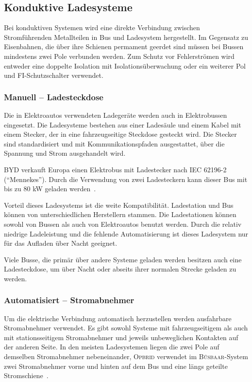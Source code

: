 \subsection{Konduktive Ladesysteme} 
Bei konduktiven Systemen wird eine direkte Verbindung zwischen Stromführenden Metallteilen in Bus und Ladesystem hergestellt. Im Gegensatz zu Eisenbahnen, die über ihre Schienen permament geerdet sind müssen bei Bussen mindestens zwei Pole verbunden werden. Zum Schutz vor Fehlerströmen wird entweder eine doppelte Isolation mit Isolationsüberwachung oder ein weiterer Pol und FI-Schutzschalter verwendet.

\subsubsection{Manuell – Ladesteckdose}
Die in Elektroautos verwendeten Ladegeräte werden auch in Elektrobussen eingesetzt. Die Ladesysteme bestehen aus einer Ladesäule und einem Kabel mit einem Stecker, der in eine fahrzeugseitige Steckdose gesteckt wird. Die Stecker sind standardisiert und mit Kommunikationspfaden ausgestattet, über die Spannung und Strom ausgehandelt wird.

\textsc{BYD} verkauft Europa einen Elektrobus mit Ladestecker nach IEC 62196-2 ("`Mennekes"'). Durch die Verwendung von zwei Ladesteckern kann dieser Bus mit bis zu 80 kW geladen werden~\cite{bydSpecs4}.

Vorteil dieses Ladesystems ist die weite Kompatibilität. Ladestation und Bus können von unterschiedlichen Herstellern stammen. Die Ladestationen können sowohl von Bussen als auch von Elektroautos benutzt werden. Durch die relativ niedrige Ladeleistung und die fehlende Automatisierung ist dieses Ladesystem nur für das Aufladen über Nacht geeignet.

Viele Busse, die primär über andere Systeme geladen werden besitzen auch eine Ladesteckdose, um über Nacht oder abseits ihrer normalen Strecke geladen zu werden.

\subsubsection{Automatisiert – Stromabnehmer}
Um die elektrische Verbindung automatisch herzustellen werden ausfahrbare Stromabnehmer verwendet. Es gibt sowohl Systeme mit fahrzeugseitigem als auch mit stationsseitigem Stromabnehmer und jeweils unbeweglichen Kontakten auf der anderen Seite. In den meisten Ladesystemen liegen die zwei Pole auf demselben Stromabnehmer nebeneinander, \textsc{Opbrid} verwendet im \textsc{Bůsbaar}-System zwei Stromabnehmer vorne und hinten auf dem Bus und eine längs geteilte Stromschiene~\cite{SchKonLade}.


